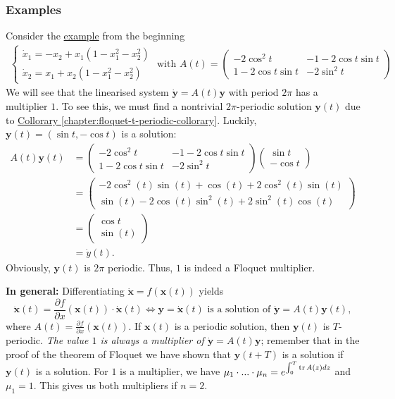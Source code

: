 \documentclass[hidelinks,a4paper, 11pt]{article}
\theoremstyle{plain}
\theoremstyle{break}
\theoremstyle{plain}
\theoremstyle{definition}
\begin{document}
{\subsubsection{Examples}
Consider the \hyperref[chapter:periodic-solutions-model-example]{example} from the beginning
\begin{align*}
\begin{cases}
\dot x_1 = -x_2 +x_1(1-x_1^2-x_2^2) \\
\dot x_2 = x_1 + x_2(1-x_1^2-x_2^2)
\end{cases} \text{ with } A(t)= \begin{pmatrix}
-2\cos^2t & -1-2\cos t \sin t \\ 
1-2 \cos t \sin t & -2 \sin^2t
\end{pmatrix}
\end{align*}
We will see that the linearised system $\mathbf{\dot y}= A(t)\mathbf y $ with period $2\pi$ has a multiplier $1$. To see this, we must find a nontrivial $2\pi$-periodic solution $\mathbf y(t)$ due to \hyperref[chapter:floquet-t-periodic-collorary]{Collorary \ref{chapter:floquet-t-periodic-collorary}}. Luckily, $\mathbf y(t) = (\sin t, -\cos t)$ is a solution:
\begin{align*}
	A(t)\mathbf y(t) &= \begin{pmatrix}
		-2\cos^2t & -1-2\cos t \sin t \\ 
		1-2 \cos t \sin t & -2 \sin^2t
	\end{pmatrix} \begin{pmatrix}
		\sin t \\ -\cos t
	\end{pmatrix}\\ &= \begin{pmatrix}
		-2 \cos^2(t) \sin(t) + \cos(t) + 2\cos^2(t)\sin(t) \\
		\sin(t) - 2\cos(t)\sin^2(t) + 2\sin^2(t) \cos(t)
	\end{pmatrix} \\
	&= \begin{pmatrix}
		\cos t \\ \sin (t)
	\end{pmatrix} \\
	&= \dot y(t).
\end{align*}
Obviously, $\mathbf y(t)$ is $2\pi$ periodic. Thus, $1$ is indeed a Floquet multiplier.
 
\textbf{In general:} Differentiating $\mathbf{\dot x} = f(\mathbf x(t))$ yields
\[
	\mathbf{\ddot x}(t) = \frac{\partial f}{\partial x}(\mathbf x(t)) \cdot \mathbf{\dot x}(t) \iff \mathbf y = \mathbf{\dot x}(t) \text{ is a solution of } \mathbf{\dot y} = A(t) \mathbf y(t),
\]
where $A(t) = \frac{\partial f}{\partial x}(\mathbf x(t))$. If $\mathbf x(t)$ is a periodic solution, then $\mathbf y(t)$ is $T$-periodic. \emph{The value $1$ is always a multiplier of $\mathbf{\dot y} = A(t) \mathbf y$}; remember that in the proof of the theorem of Floquet we have shown that $\mathbf y(t+T)$ is a solution if $\mathbf y(t)$ is a solution. For $1$ is a multiplier, we have $\mu_1 \cdot ... \cdot \mu_n = e^{\int^T_0 \tr A(z) dz}$ and $\mu_1 = 1$. This gives us both multipliers if $n = 2$.

}
\end{document}
